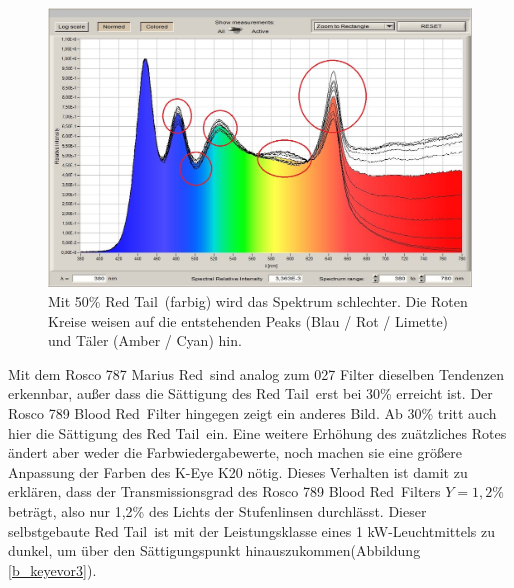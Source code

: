 \begin{figure}[H]     %
\centering
\includegraphics[width=1.0\textwidth]{bilder/keyevor2} 
\caption {Mit 50\% \glqq Red Tail\grqq\ (farbig) wird das Spektrum schlechter. Die Roten Kreise weisen auf die entstehenden Peaks (Blau / Rot / Limette) und Täler (Amber / Cyan) hin.}\label{b_keyevor2}
\end{figure}


Mit dem Rosco 787 \glqq Marius Red\grqq\ sind analog zum 027 Filter dieselben Tendenzen erkennbar, außer dass die Sättigung des \glqq Red Tail\grqq\ erst bei 30\% erreicht ist.
Der Rosco 789 \glqq Blood Red\grqq\ Filter hingegen zeigt ein anderes Bild. Ab 30\% tritt auch hier die Sättigung des \glqq Red Tail\grqq\ ein. Eine weitere Erhöhung des zuätzliches Rotes ändert aber weder die Farbwiedergabewerte, noch machen sie eine größere Anpassung der Farben des K-Eye K20 nötig. Dieses Verhalten ist damit zu erklären, dass der Transmissionsgrad des Rosco 789 \glqq Blood Red\grqq\ Filters  $Y=1,2\%$ beträgt, also nur 1,2\% des Lichts der Stufenlinsen durchlässt. Dieser selbstgebaute \glqq Red Tail\grqq\ ist mit der Leistungsklasse eines 1 kW-Leuchtmittels zu dunkel, um über den Sättigungspunkt hinauszukommen(Abbildung \ref{b_keyevor3}).  

